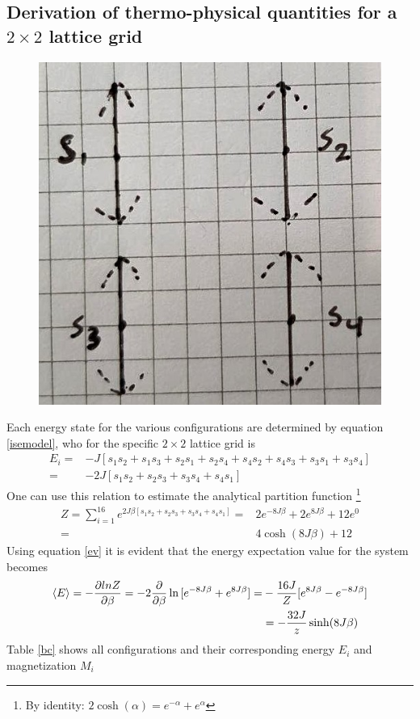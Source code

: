 \documentclass[%
reprint,nofootinbib,
amsmath,amssymb,
aps,
]{revtex4-1}
\begin{document}
\subsection{Derivation of thermo-physical quantities for a $2\times 2$ lattice grid}
\begin{figure}
	\includegraphics[scale = 0.5]{Figures/si.jpg}
	\caption{\label{si}}
\end{figure}
Each energy state for the various configurations are determined by equation \ref{isemodel}, who for the specific $2\times2$ lattice grid is
\begin{align*}
E_i  =& -J[s_1s_2 + s_1s_3 + s_2s_1+s_2s_4+s_4s_2+s_4s_3 + s_3s_1 + s_3s_4] \nonumber \\
= &-2J[s_1s_2 + s_2s_3 + s_3s_4 + s_4s_1]
\end{align*}\vspace{1mm} 
One can use this relation to estimate the analytical partition function \footnote{By identity: $2\cosh(\alpha) = e^{-\alpha} + e^{\alpha}$}
\begin{align*}
Z = \sum_{i = 1}^{16}e^{2J\beta[s_1s_2 + s_2s_3 + s_3s_4 + s_4s_1]}
=&  2e^{-8J\beta} + 2e^{8J\beta} + 12e^0\nonumber \\
= & 4\cosh(8J\beta) + 12 
\end{align*} 
Using equation \ref{ev} it is evident that the energy expectation value for the system becomes 
\begin{align*}
\expval{E} = -\dfrac{\partial ln Z}{\partial \beta} = -2\dfrac{\partial}{\partial \beta}\ln{[e^{-8J\beta} + e^{8J\beta}]} =& -\dfrac{16J}{Z}[e^{8J\beta} - e^{-8J\beta}] \\ 
& = -\dfrac{32J}{z}\sinh(8J\beta)
\end{align*}
Table \ref{bc} shows all configurations and their corresponding energy $E_i$ and magnetization $M_i$
\end{document}
